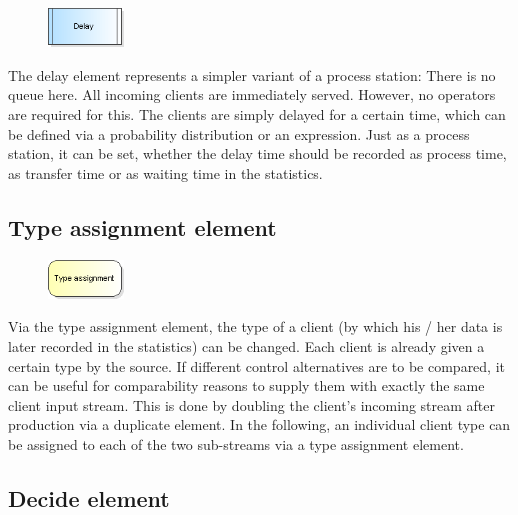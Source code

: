 \documentclass{svmono}
\begin{document}
\begin{figure}
\vspace{-22pt}
\includegraphics[width=2cm]{IconDelay.png}
\vspace{-22pt}
\end{figure}
The delay element represents a simpler variant of a process station: There is no queue here. All incoming clients are immediately served. However, no operators are required for this. The clients are simply delayed for a certain time, which can be defined via a probability distribution or an expression. Just as a process station, it can be set, whether the delay time should be recorded as process time, as transfer time or as waiting time in the statistics.

\subsection*{Type assignment element}

\begin{figure}
\vspace{-22pt}
\includegraphics[width=2cm]{IconAssign.png}
\vspace{-22pt}
\end{figure}
Via the type assignment element, the type of a client (by which his / her data is later recorded in the statistics) can be changed. Each client is already given a certain type by the source. If different control alternatives are to be compared, it can be useful for comparability reasons to supply them with exactly the same client input stream. This is done by doubling the client's incoming stream after production via a duplicate element. In the following, an individual client type can be assigned to each of the two sub-streams via a type assignment element.

\subsection*{Decide element}
\end{document}
